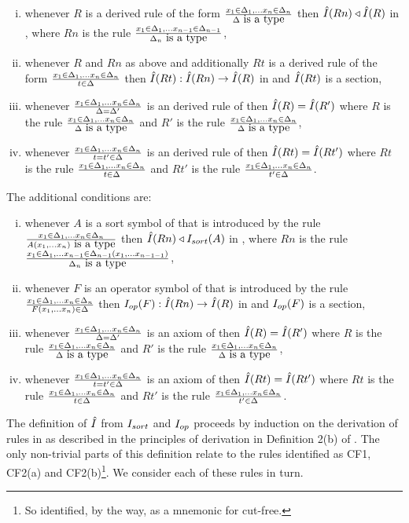 \begin{enumerate}[(i)]
\setlength\itemindent{2cm}
\item whenever $R$ is a derived rule of the form $\frac{x_1 \in \Delta_1,... x_{n} \in \Delta_{n}}{\Delta\mbox{ is a type}}$
then $\hat{I}(Rn) \triangleleft \hat{I}(R)$ in \catc, where $Rn$ is the rule
$\frac{x_1 \in \Delta_1,... x_{n-1} \in \Delta_{n-1}}{\Delta_n\mbox{ is a type}}$,

\item whenever $R$ and $Rn$ as above and additionally $Rt$ is a derived rule of the form $\frac{x_1 \in \Delta_1,... x_{n} \in \Delta_{n}}{t \in \Delta}$
then $\hat{I}(Rt) : \hat{I}(Rn) \rightarrow \hat{I}(R)$  in \catcw and $\hat{I}(Rt)$ is a section, 

\item whenever
$\frac{x_1 \in \Delta_1,... x_{n} \in \Delta_{n}}{\Delta = \Delta'}$
is an derived rule of \gatU then $\hat{I}(R) = \hat{I}(R')$
where $R$ is the rule
$\frac{x_1 \in \Delta_1,... x_{n} \in \Delta_{n}}{\Delta\mbox{ is a type}}$
and $R'$ is the rule
$\frac{x_1 \in \Delta_1,... x_{n} \in \Delta_{n}}{\Delta\mbox{ is a type}}$,

\item whenever
$\frac{x_1 \in \Delta_1,... x_{n} \in \Delta_{n}}{t = t' \in \Delta}$
is an derived rule of \gatUw then $\hat{I}(Rt) = \hat{I}(Rt')$
where $Rt$ is the rule
$\frac{x_1 \in \Delta_1,... x_{n} \in \Delta_{n}}{t \in \Delta}$
and $Rt'$ is the rule
$\frac{x_1 \in \Delta_1,... x_{n} \in \Delta_{n}}{t' \in \Delta}$.
\end{enumerate}

\note The additional conditions are:
\begin{enumerate}[(i)]
\setlength\itemindent{2cm}
\item
whenever $A$ is a sort symbol of \gatUw that is introduced by the rule
$\frac{x_1 \in \Delta_1,... x_{n} \in \Delta_{n}}{A(x_1,...x_n)\mbox{ is a type}}$
then $\hat{I}(Rn) \triangleleft I_{sort}(A)$ in \catc, where $Rn$ is the rule
$\frac{x_1 \in \Delta_1,... x_{n-1} \in \Delta_{n-1}(x_1,...x_{n-1-1})}{\Delta_n\mbox{ is a type}}$,
\item
whenever $F$ is an operator symbol of \gatUw that is introduced by the rule
$\frac{x_1 \in \Delta_1,... x_{n} \in \Delta_{n}}{F(x_1,...x_n) \in \Delta}$
then $I_{op}(F) : \hat{I}(Rn) \rightarrow \hat{I}(R)$  in \catcw and $I_{op}(F)$ is a section,
\item whenever
$\frac{x_1 \in \Delta_1,... x_{n} \in \Delta_{n}}{\Delta = \Delta'}$
is an axiom of \gatUw then $\hat{I}(R) = \hat{I}(R')$
where $R$ is the rule
$\frac{x_1 \in \Delta_1,... x_{n} \in \Delta_{n}}{\Delta\mbox{ is a type}}$
and $R'$ is the rule
$\frac{x_1 \in \Delta_1,... x_{n} \in \Delta_{n}}{\Delta\mbox{ is a type}}$,
\item whenever
$\frac{x_1 \in \Delta_1,... x_{n} \in \Delta_{n}}{t = t' \in \Delta}$
is an axiom of \gatUw then $\hat{I}(Rt) = \hat{I}(Rt')$
where $Rt$ is the rule
$\frac{x_1 \in \Delta_1,... x_{n} \in \Delta_{n}}{t \in \Delta}$
and $Rt'$ is the rule
$\frac{x_1 \in \Delta_1,... x_{n} \in \Delta_{n}}{t' \in \Delta}$.
\end{enumerate}

\note The definition of $\hat{I}$ from $I_{sort}$ and $I_{op}$ proceeds by induction 
on the derivation of rules in  \gatUw 
as described in the principles of derivation in Definition 2(b) of \cite{Cartmell86}. 
The only non-trivial parts of this definition relate to the rules
identified as CF1, CF2(a) and CF2(b)\footnote{So identified, by the way, as a mnemonic for cut-free.}. We consider each of these rules in turn.

